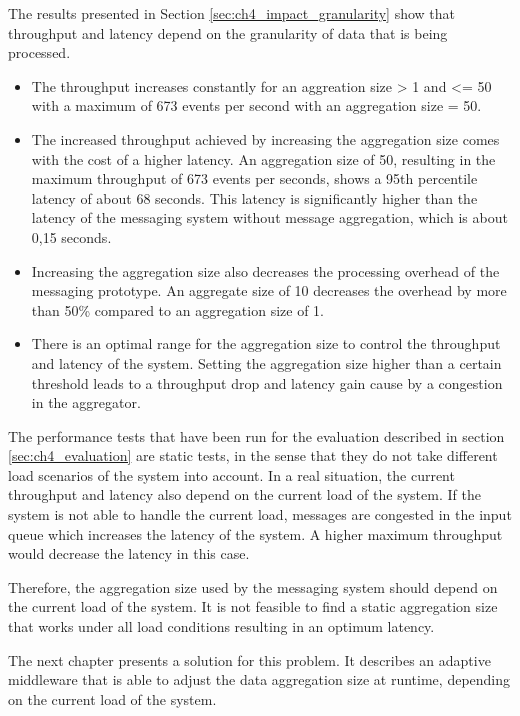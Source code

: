 The results presented in Section \ref{sec:ch4_impact_granularity} show that throughput and latency depend on the granularity of data that is being processed. 
\begin{itemize}
	\item The throughput increases constantly for an aggreation size > 1 and <= 50 with a maximum of 673 events per second with an aggregation size = 50.
	\item The increased throughput achieved by increasing the aggregation size comes with the cost of a higher latency. An aggregation size of 50, resulting in the maximum throughput of 673 events per seconds, shows a 95th percentile latency of about 68 seconds. This latency is significantly higher than the latency of the messaging system without message aggregation, which is about 0,15 seconds.
	\item Increasing the aggregation size also decreases the processing overhead of the messaging prototype. An aggregate size of 10 decreases the overhead by more than 50\% compared to an aggregation size of 1.
	\item There is an optimal range for the aggregation size to control the throughput and latency of the system. Setting the aggregation size higher than a certain threshold leads to a throughput drop and latency gain cause by a congestion in the aggregator.
\end{itemize}

The performance tests that have been run for the evaluation described in section \ref{sec:ch4_evaluation} are static tests, in the sense that they do not take different load scenarios of the system into account. In a real situation, the current throughput and latency also depend on the current load of the system. If the system is not able to handle the current load, messages are congested in the input queue which increases the latency of the system. A higher maximum throughput would decrease the latency in this case. 

Therefore, the aggregation size used by the messaging system should depend on the current load of the system. It is not feasible to find a static aggregation size that works under all load conditions resulting in an optimum latency.

The next chapter presents a solution for this problem. It describes an adaptive middleware that is able to adjust the data aggregation size at runtime, depending on the current load of the system.